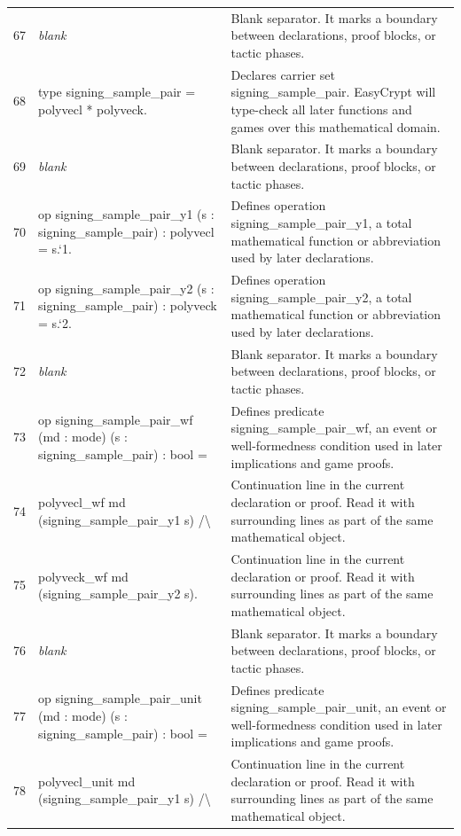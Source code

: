 \documentclass[10pt]{article}
\begin{document}
\begin{longtable}{r L{0.53\textwidth} L{0.37\textwidth}}
67 & {\ttfamily\scriptsize \emph{blank}} & Blank separator.  It marks a boundary between declarations, proof blocks, or tactic phases. \\
68 & {\ttfamily\scriptsize type signing\_sample\_pair = polyvecl * polyveck.} & Declares carrier set signing\_sample\_pair.  EasyCrypt will type-check all later functions and games over this mathematical domain. \\
69 & {\ttfamily\scriptsize \emph{blank}} & Blank separator.  It marks a boundary between declarations, proof blocks, or tactic phases. \\
70 & {\ttfamily\scriptsize op signing\_sample\_pair\_y1 (s : signing\_sample\_pair) : polyvecl = s.`1.} & Defines operation signing\_sample\_pair\_y1, a total mathematical function or abbreviation used by later declarations. \\
71 & {\ttfamily\scriptsize op signing\_sample\_pair\_y2 (s : signing\_sample\_pair) : polyveck = s.`2.} & Defines operation signing\_sample\_pair\_y2, a total mathematical function or abbreviation used by later declarations. \\
72 & {\ttfamily\scriptsize \emph{blank}} & Blank separator.  It marks a boundary between declarations, proof blocks, or tactic phases. \\
73 & {\ttfamily\scriptsize op signing\_sample\_pair\_wf (md : mode) (s : signing\_sample\_pair) : bool =} & Defines predicate signing\_sample\_pair\_wf, an event or well-formedness condition used in later implications and game proofs. \\
74 & {\ttfamily\scriptsize   polyvecl\_wf md (signing\_sample\_pair\_y1 s) /\textbackslash{}} & Continuation line in the current declaration or proof.  Read it with surrounding lines as part of the same mathematical object. \\
75 & {\ttfamily\scriptsize   polyveck\_wf md (signing\_sample\_pair\_y2 s).} & Continuation line in the current declaration or proof.  Read it with surrounding lines as part of the same mathematical object. \\
76 & {\ttfamily\scriptsize \emph{blank}} & Blank separator.  It marks a boundary between declarations, proof blocks, or tactic phases. \\
77 & {\ttfamily\scriptsize op signing\_sample\_pair\_unit (md : mode) (s : signing\_sample\_pair) : bool =} & Defines predicate signing\_sample\_pair\_unit, an event or well-formedness condition used in later implications and game proofs. \\
78 & {\ttfamily\scriptsize   polyvecl\_unit md (signing\_sample\_pair\_y1 s) /\textbackslash{}} & Continuation line in the current declaration or proof.  Read it with surrounding lines as part of the same mathematical object. \\

\end{longtable}
\end{document}
